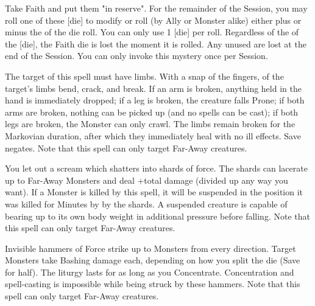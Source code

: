 {\MYSTERY [
  Name = Kismet,
  Link = arcana-mystery-kismet,
  Paradigm = Entropy,
  Save = n/a,
  Duration = Session,
  Target = See Below
]

Take \DICE Faith and put them "in reserve".  For the remainder of the Session, you may roll one of these [die] to modify  \RO or \RB roll (by Ally or Monster alike) either plus or minus the \SUMDICE of the die roll.  You can only use 1 [die] per roll.  Regardless of the \SUMDICE of the [die], the Faith die is lost the moment it is rolled.  Any unused \DICE are lost at the end of the Session.  You can only invoke this mystery once per Session.

\MYSTERY [
  Name = Limbbreaker,
  Link = arcana-mystery-limbbreaker,
  Paradigm = Biomancy,
  Save = Y (neg.),
  Duration = Markovian,
  Target = Far-Away Target(s)
]

The target of this spell must have limbs.  With a snap of the fingers, \DICE of the target's limbs bend, crack, and break.  If an arm is broken, anything held in the hand is immediately dropped; if a leg is broken, the creature falls Prone; if both arms are broken, nothing can be picked up (and no spells can be cast); if both legs are broken, the Monster can only crawl.  The limbs remain broken for the Markovian duration, after which they immediately heal with no ill effects. Save negates.  Note that this spell can only target Far-Away creatures.

\MYSTERY [
  Name = Shrikeblast,
  Link = arcana-mystery-shrikeblast,
  Paradigm = Force,
  Save = Y (half),
  Duration = Instant,
  Target = Far-Away Target(s)
]

You let out a scream which shatters into shards of force.  The shards can lacerate up to \DICE  Far-Away Monsters and deal \SUMDICE+\DICE total damage (divided up any way you want).  If a Monster is killed by this spell, it will be suspended in the position it was killed for \SUMDICE Minutes by by the shards. A suspended creature is capable of bearing up to its own body weight in additional pressure before falling.  Note that this spell can only target Far-Away creatures.

\MYSTERY [
  Name = Storm of Hammers,
  Link = arcana-mystery-storm-of-hammers,
  Paradigm = Force,
  Save = Y (half),
  Duration = Concentration,
  Target = Far-Away Target(s)
]

Invisible hammers of Force strike up to \DICE Monsters from every direction.  Target Monsters take \DICE Bashing damage each, depending on how you split the die (Save for half).  The liturgy lasts for as long as you Concentrate.  Concentration and spell-casting is impossible while being struck by these hammers. Note that this spell can only target Far-Away creatures.

}
